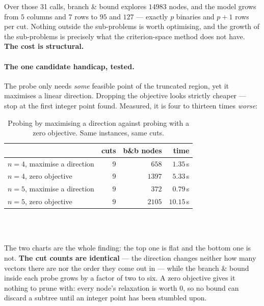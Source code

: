 \documentclass[11pt,a4paper]{article}
\begin{document}
\noindent
Over those 31 calls, branch \& bound explores $14983$ nodes, and the model
grows from $5$ columns and $7$ rows to $95$ and $127$ --- exactly $p$ binaries
and $p+1$ rows per cut.  Nothing outside the sub-problems is worth optimising,
and the growth of the sub-problems is precisely what the criterion-space method
does not have.  \textbf{The cost is structural.}

\paragraph{The one candidate handicap, tested.}  The probe only needs
\emph{some} feasible point of the truncated region, yet it maximises a linear
direction.  Dropping the objective looks strictly cheaper --- stop at the first
integer point found.  Measured, it is four to thirteen times \emph{worse}:

\begin{table}[h]
\centering
\caption{Probing by maximising a direction against probing with a zero
objective.  Same instances, same cuts.}
\begin{tabular}{lrrr}
\toprule
 & cuts & b\&b nodes & time \\
\midrule
$n=4$, maximise a direction & $9$ & $658$  & $\mathbf{1.35}$\,s \\
$n=4$, zero objective       & $9$ & $1397$ & $5.33$\,s \\
$n=5$, maximise a direction & $9$ & $372$  & $\mathbf{0.79}$\,s \\
$n=5$, zero objective       & $9$ & $2105$ & $10.15$\,s \\
\bottomrule
\end{tabular}
\end{table}

\begin{center}
\\[6pt]
\\[2pt]
\end{center}

\noindent
The two charts are the whole finding: the top one is flat and the bottom one is
not.  \textbf{The cut counts are identical} --- the direction changes neither
how many vectors there are nor the order they come out in --- while the branch
\& bound inside each probe grows by a factor of two to six.  A zero objective
gives it nothing to prune with: every node's relaxation is worth $0$, so no
bound can discard a subtree until an integer point has been stumbled upon.
\end{document}
